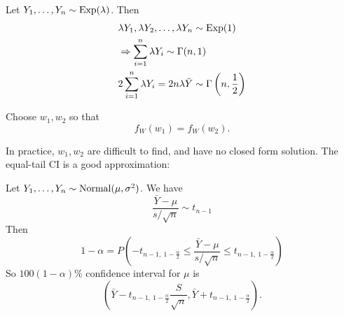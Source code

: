 \begin{eg}
Let $Y_1,\ldots,Y_n\sim \operatorname*{Exp}(\lambda)$. Then
\begin{align*}
    &\lambda Y_1, \lambda Y_2, \ldots, \lambda Y_n \sim \operatorname*{Exp}(1) \\
    &\Rightarrow \sum^n_{i=1}\lambda Y_i\sim \Gamma(n,1) \\
	&2\sum^n_{i=1} \lambda Y_i=2n\lambda \bar{Y}\sim \Gamma\left(n,\frac{1}{2}\right)
\end{align*}

Choose $w_1,w_2$ so that
$$
f_W(w_1)=f_W(w_2).
$$

In practice, $w_1,w_2$ are difficult to find, and have no closed form solution. The equal-tail CI is a good approximation:


\end{eg}
\begin{eg}
Let $Y_1,\ldots, Y_n\sim \operatorname*{Normal}(\mu, \sigma^2)$. We have
$$\frac{\bar Y-\mu}{s/\sqrt n}\sim t_{n-1}$$
Then
$$1-\alpha=P\left(-t_{n-1, \ 1-\frac{\alpha}{2}} \leq \frac{\bar Y-\mu}{s/\sqrt n}\leq t_{n-1, \ 1-\frac{\alpha}{2}}\right)
$$
So $100(1-\alpha)\%$ confidence interval for $\mu$ is 
$$
\left(\bar Y-t_{n-1, \ 1-\frac{\alpha}{2}}\frac{S}{\sqrt n},\bar Y+t_{n-1, \ 1-\frac{\alpha}{2}}\right).
$$
\end{eg}
